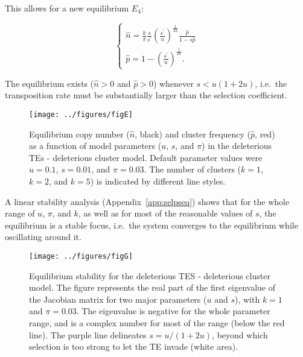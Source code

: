 \documentclass[10pt,a4paper]{article}
\begin{document}
This allows for a new equilibrium $E_4$:

\begin{equation}\label{eq:selpseq}
\begin{cases}
\displaystyle \hat n = \frac{k}{\pi}\frac{s}{s^\prime} \left(\frac{s^\prime}{u}\right)^\frac{1}{2k}\frac{\hat p}{1-s\hat p} \\
\displaystyle \hat p = 1 - \left(\frac{s^\prime}{u}\right)^\frac{1}{2k}.
\end{cases}
\end{equation}

The equilibrium exists ($\hat n > 0$ and $\hat p > 0$) whenever $s < u(1+2u)$, i.e.\ the transposition rate must be substantially larger than the selection coefficient. 

\begin{figure}
\begin{adjustwidth}{-1in}{0in}
\begin{center}
	\texttt{[image: ../figures/figE]}
\caption{\label{fig:figE} Equilibrium copy number ($\hat n$, black) and cluster frequency ($\hat p$, red) as a function of model parameters ($u$, $s$, and $\pi$) in the deleterious TEs - deleterious cluster model. Default parameter values were $u=0.1$, $s=0.01$, and $\pi=0.03$. The number of clusters ($k=1$, $k=2$, and $k=5$) is indicated by different line styles. }
\end{center}\end{adjustwidth}
\end{figure}

A linear stability analysis (Appendix~\ref{app:selpseq}) shows that for the whole range of $u$, $\pi$, and $k$, as well as for most of the reasonable values of $s$, the equilibrium is a stable focus, i.e.\ the system converges to the equilibrium while oscillating around it. 

\begin{figure}
\begin{adjustwidth}{-1in}{0in}
\begin{center}
	\texttt{[image: ../figures/figG]}
\caption{\label{fig:figG} Equilibrium stability for the deleterious TES - deleterious cluster model. The figure represents the real part of the first eigenvalue of the Jacobian matrix for two major parameters ($u$ and $s$), with $k=1$ and $\pi = 0.03$. The eigenvalue is negative for the whole parameter range, and is a complex number for most of the range (below the red line). The purple line delineates $s = u/(1+2u)$, beyond which selection is too strong to let the TE invade (white area). }
\end{center}\end{adjustwidth}
\end{figure}
\end{document}
